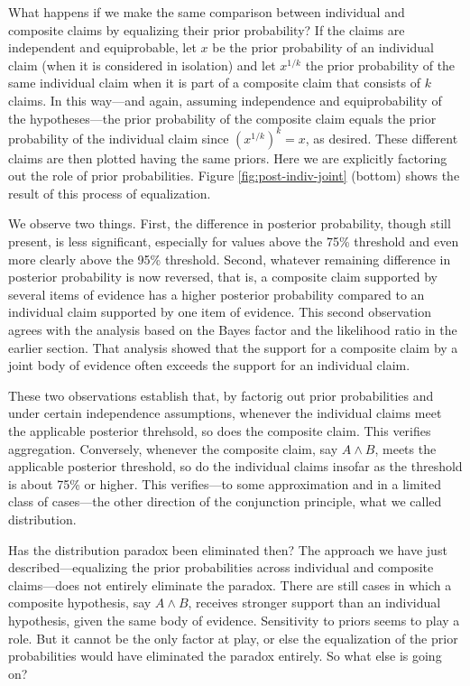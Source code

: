 \documentclass[10pt,dvipsnames,enabledeprecatedfontcommands]{scrartcl}
\begin{document}
What happens if we make the same comparison between individual and
composite claims by equalizing their prior probability? If the claims
are independent and equiprobable, let \(x\) be the prior probability of
an individual claim (when it is considered in isolation) and let
\(x^{1/k}\) the prior probability of the same individual claim when it
is part of a composite claim that consists of \(k\) claims. In this
way---and again, assuming independence and equiprobability of the
hypotheses---the prior probability of the composite claim equals the
prior probability of the individual claim since \((x^{1/k})^k=x\), as
desired. These different claims are then plotted having the same priors.
Here we are explicitly factoring out the role of prior probabilities.
Figure \ref{fig:post-indiv-joint} (bottom) shows the result of this
process of equalization.

We observe two things. First, the difference in posterior probability,
though still present, is less significant, especially for values above
the 75\% threshold and even more clearly above the 95\% threshold.
Second, whatever remaining difference in posterior probability is now
reversed, that is, a composite claim supported by several items of
evidence has a higher posterior probability compared to an individual
claim supported by one item of evidence. This second observation agrees
with the analysis based on the Bayes factor and the likelihood ratio in
the earlier section. That analysis showed that the support for a
composite claim by a joint body of evidence often exceeds the support
for an individual claim.

These two observations establish that, by factorig out prior
probabilities and under certain independence assumptions, whenever the
individual claims meet the applicable posterior threhsold, so does the
composite claim. This verifies aggregation. Conversely, whenever the
composite claim, say \(A \wedge B\), meets the applicable posterior
threshold, so do the individual claims insofar as the threshold is about
75\% or higher. This verifies---to some approximation and in a limited
class of cases---the other direction of the conjunction principle, what
we called distribution.

Has the distribution paradox been eliminated then? The approach we have
just described---equalizing the prior probabilities across individual
and composite claims---does not entirely eliminate the paradox. There
are still cases in which a composite hypothesis, say \(A \wedge B\),
receives stronger support than an individual hypothesis, given the same
body of evidence. Sensitivity to priors seems to play a role. But it
cannot be the only factor at play, or else the equalization of the prior
probabilities would have eliminated the paradox entirely. So what else
is going on?
\end{document}

